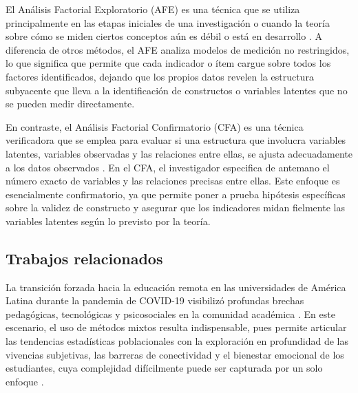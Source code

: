 \documentclass[conference]{IEEEtran}
\begin{document}
El Análisis Factorial Exploratorio (AFE) es una técnica que se utiliza principalmente en las etapas iniciales de una investigación o cuando la teoría sobre cómo se miden ciertos conceptos aún es débil o está en desarrollo \cite{kline2023principles}. A diferencia de otros métodos, el AFE analiza modelos de medición no restringidos, lo que significa que permite que cada indicador o ítem cargue sobre todos los factores identificados, dejando que los propios datos revelen la estructura subyacente que lleva a la identificación de constructos o variables latentes que no se pueden medir directamente.

En contraste, el Análisis Factorial Confirmatorio (CFA) es una técnica verificadora que se emplea para evaluar si una estructura que involucra variables latentes, variables observadas y las relaciones entre ellas, se ajusta adecuadamente a los datos observados \cite{kline2023principles}. En el CFA, el investigador especifica de antemano el número exacto de variables y las relaciones precisas entre ellas. Este enfoque es esencialmente confirmatorio, ya que permite poner a prueba hipótesis específicas sobre la validez de constructo y asegurar que los indicadores midan fielmente las variables latentes según lo previsto por la teoría.

\subsection{Trabajos relacionados}

La transición forzada hacia la educación remota en las universidades de América Latina durante la pandemia de COVID-19 visibilizó profundas brechas pedagógicas, tecnológicas y psicosociales en la comunidad académica \cite{VillaCastano2022RemoteLessons, Benalcazar2022EducationalImpact}. En este escenario, el uso de métodos mixtos resulta indispensable, pues permite articular las tendencias estadísticas poblacionales con la exploración en profundidad de las vivencias subjetivas, las barreras de conectividad y el bienestar emocional de los estudiantes, cuya complejidad difícilmente puede ser capturada por un solo enfoque \cite{creswellDesigningConductingMixed}.
\end{document}
